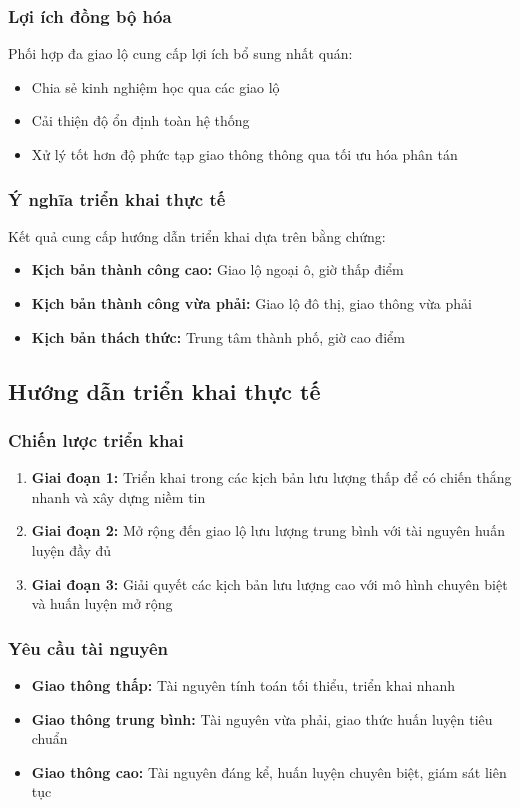\subsubsection{Lợi ích đồng bộ hóa}
Phối hợp đa giao lộ cung cấp lợi ích bổ sung nhất quán:
\begin{itemize}
    \item Chia sẻ kinh nghiệm học qua các giao lộ
    \item Cải thiện độ ổn định toàn hệ thống
    \item Xử lý tốt hơn độ phức tạp giao thông thông qua tối ưu hóa phân tán
\end{itemize}

\subsubsection{Ý nghĩa triển khai thực tế}
Kết quả cung cấp hướng dẫn triển khai dựa trên bằng chứng:
\begin{itemize}
    \item \textbf{Kịch bản thành công cao:} Giao lộ ngoại ô, giờ thấp điểm
    \item \textbf{Kịch bản thành công vừa phải:} Giao lộ đô thị, giao thông vừa phải
    \item \textbf{Kịch bản thách thức:} Trung tâm thành phố, giờ cao điểm
\end{itemize}

\subsection{Hướng dẫn triển khai thực tế}

\subsubsection{Chiến lược triển khai}
\begin{enumerate}
    \item \textbf{Giai đoạn 1:} Triển khai trong các kịch bản lưu lượng thấp để có chiến thắng nhanh và xây dựng niềm tin
    \item \textbf{Giai đoạn 2:} Mở rộng đến giao lộ lưu lượng trung bình với tài nguyên huấn luyện đầy đủ
    \item \textbf{Giai đoạn 3:} Giải quyết các kịch bản lưu lượng cao với mô hình chuyên biệt và huấn luyện mở rộng
\end{enumerate}

\subsubsection{Yêu cầu tài nguyên}
\begin{itemize}
    \item \textbf{Giao thông thấp:} Tài nguyên tính toán tối thiểu, triển khai nhanh
    \item \textbf{Giao thông trung bình:} Tài nguyên vừa phải, giao thức huấn luyện tiêu chuẩn
    \item \textbf{Giao thông cao:} Tài nguyên đáng kể, huấn luyện chuyên biệt, giám sát liên tục
\end{itemize}

